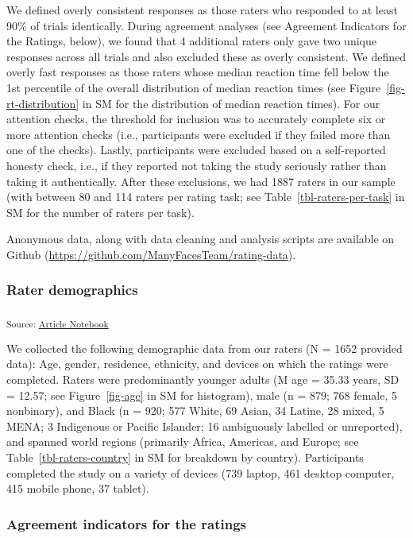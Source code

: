 \documentclass[
  letterpaper,
  DIV=11,
  numbers=noendperiod]{scrartcl}
\begin{document}
We defined overly consistent responses as those raters who responded to
at least 90\% of trials identically. During agreement analyses (see
Agreement Indicators for the Ratings, below), we found that 4 additional
raters only gave two unique responses across all trials and also
excluded these as overly consistent. We defined overly fast responses as
those raters whose median reaction time fell below the 1st percentile of
the overall distribution of median reaction times (see
Figure~\ref{fig-rt-distribution} in SM for the distribution of median
reaction times). For our attention checks, the threshold for inclusion
was to accurately complete six or more attention checks (i.e.,
participants were excluded if they failed more than one of the checks).
Lastly, participants were excluded based on a self-reported honesty
check, i.e., if they reported not taking the study seriously rather than
taking it authentically. After these exclusions, we had 1887 raters in
our sample (with between 80 and 114 raters per rating task; see
Table~\ref{tbl-raters-per-task} in SM for the number of raters per
task).

Anonymous data, along with data cleaning and analysis scripts are
available on Github
(\url{https://github.com/ManyFacesTeam/rating-data}).

\subsubsection{Rater demographics}\label{rater-demographics}

\textsubscript{Source:
\href{https://ManyFacesTeam.github.io/paper/index.qmd.html}{Article
Notebook}}

We collected the following demographic data from our raters (N = 1652
provided data): Age, gender, residence, ethnicity, and devices on which
the ratings were completed. Raters were predominantly younger adults (M
age = 35.33 years, SD = 12.57; see Figure~\ref{fig-age} in SM for
histogram), male (n = 879; 768 female, 5 nonbinary), and Black (n = 920;
577 White, 69 Asian, 34 Latine, 28 mixed, 5 MENA; 3 Indigenous or
Pacific Islander; 16 ambiguously labelled or unreported), and spanned
world regions (primarily Africa, Americas, and Europe; see
Table~\ref{tbl-raters-country} in SM for breakdown by country).
Participants completed the study on a variety of devices (739 laptop,
461 desktop computer, 415 mobile phone, 37 tablet).

\subsubsection{Agreement indicators for the
ratings}\label{agreement-indicators-for-the-ratings}
\end{document}
